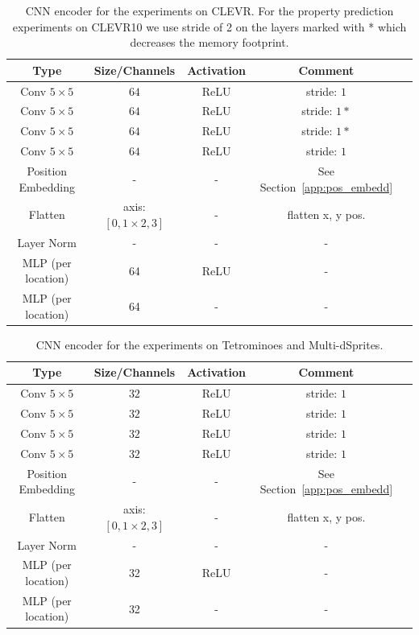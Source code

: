 \documentclass{article}
\begin{document}
\begin{table}[htp!]
\centering
\caption{CNN encoder for the experiments on CLEVR. For the property prediction experiments on CLEVR10 we use stride of 2 on the layers marked with * which decreases the memory footprint.}
\begin{tabular}{ccccc}
\toprule
Type & Size/Channels & Activation & Comment \\
\midrule
Conv $5\times 5$ & $64$ & ReLU & stride: $1$\\
Conv $5\times 5$ & $64$ & ReLU & stride: $1*$\\
Conv $5\times 5$ & $64$ & ReLU & stride: $1*$\\
Conv $5\times 5$ & $64$ & ReLU & stride: $1$\\
Position Embedding & - & - & See Section~\ref{app:pos_embedd}\\
Flatten & axis: $[0,1\times 2, 3]$ & - & flatten x, y pos. \\
Layer Norm & - & - & -  \\
MLP (per location) & 64 & ReLU & - \\
MLP (per location) & 64 & - & - \\
\bottomrule
\end{tabular}
\label{table:architecture_cnn_enc}
\end{table}

\begin{table}[htp!]
\centering
\caption{CNN encoder for the experiments on Tetrominoes and Multi-dSprites.}
\begin{tabular}{ccccc}
\toprule
Type & Size/Channels & Activation & Comment \\
\midrule
Conv $5\times 5$ & $32$ & ReLU & stride: $1$\\
Conv $5\times 5$ & $32$ & ReLU & stride: $1$\\
Conv $5\times 5$ & $32$ & ReLU & stride: $1$\\
Conv $5\times 5$ & $32$ & ReLU & stride: $1$\\
Position Embedding & - & - &  See Section~\ref{app:pos_embedd} \\
Flatten & axis: $[0,1\times 2, 3]$ & - & flatten x, y pos. \\
Layer Norm & - & - & - \\
MLP (per location) & 32 & ReLU & - \\
MLP (per location) & 32 & - & - \\
\bottomrule
\end{tabular}
\label{table:architecture_cnn_enc_tetr}
\end{table}
\end{document}
